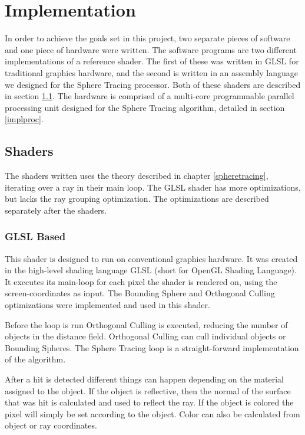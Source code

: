 \chapter{Implementation}

	In order to achieve the goals set in this project, two separate pieces of
	software and one piece of hardware were written. The software programs are
	two different implementations of a reference shader. The first of these was
	written in GLSL\cite{glsl} for traditional graphics hardware, and the second
	is written in an assembly language we designed for the Sphere Tracing
	processor. Both of these shaders are described in section \ref{implshader}.
	The hardware is comprised of a multi-core programmable parallel processing
	unit designed for the Sphere Tracing algorithm, detailed in section
	\ref{implproc}.
	
	\section{Shaders} \label{implshader}

		The shaders written uses the theory described in chapter
		\ref{spheretracing}, iterating over a ray in their main loop. The GLSL
		shader has more optimizations, but lacks the ray grouping optimization. The
		optimizations are described separately after the shaders.

		\subsection{GLSL Based}
	
			This shader is designed to run on conventional graphics hardware. It was
			created in the high-level shading language GLSL (short for OpenGL Shading
			Language). It executes its main-loop for each pixel the shader is
			rendered on, using the screen-coordinates as input. The Bounding Sphere
			and Orthogonal Culling optimizations were implemented and used in 
			this
			shader.
			
			Before the loop is run Orthogonal Culling is executed, reducing the
			number of objects in the distance field. Orthogonal Culling can cull
			individual objects or Bounding Spheres. The Sphere Tracing loop is a
			straight-forward implementation of the algorithm.
			
			After a hit is detected different things can happen depending on the
			material assigned to the object. If the object is reflective, then the
			normal of the surface that was hit is calculated and used to reflect the
			ray. If the object is colored the pixel will simply be set according to
			the object. Color can also be calculated from object or ray coordinates.

